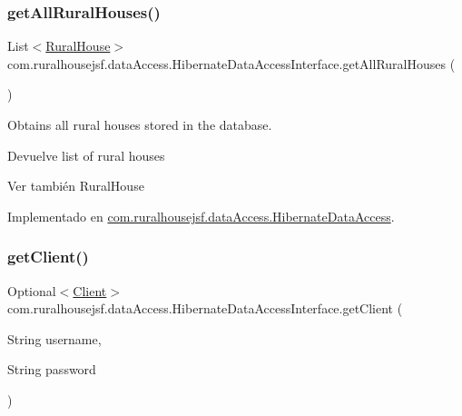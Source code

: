 \subsubsection{\texorpdfstring{getAllRuralHouses()}{getAllRuralHouses()}}
{\footnotesize\ttfamily List$<$\mbox{\hyperlink{classcom_1_1ruralhousejsf_1_1domain_1_1_rural_house}{Rural\+House}}$>$ com.\+ruralhousejsf.\+data\+Access.\+Hibernate\+Data\+Access\+Interface.\+get\+All\+Rural\+Houses (\begin{DoxyParamCaption}{ }\end{DoxyParamCaption})}



Obtains all rural houses stored in the database. 

\begin{DoxyReturn}{Devuelve}
list of rural houses
\end{DoxyReturn}
\begin{DoxySeeAlso}{Ver también}
Rural\+House 
\end{DoxySeeAlso}


Implementado en \mbox{\hyperlink{classcom_1_1ruralhousejsf_1_1data_access_1_1_hibernate_data_access_acb92be47dc680218ff3102addce8ae8f}{com.\+ruralhousejsf.\+data\+Access.\+Hibernate\+Data\+Access}}.

\mbox{\label{interfacecom_1_1ruralhousejsf_1_1data_access_1_1_hibernate_data_access_interface_abf581529aefd317dffd1d2ca0906c3ac}} 
\subsubsection{\texorpdfstring{getClient()}{getClient()}}
{\footnotesize\ttfamily Optional$<$\mbox{\hyperlink{classcom_1_1ruralhousejsf_1_1domain_1_1_client}{Client}}$>$ com.\+ruralhousejsf.\+data\+Access.\+Hibernate\+Data\+Access\+Interface.\+get\+Client (\begin{DoxyParamCaption}\item[{String}]{username,  }\item[{String}]{password }\end{DoxyParamCaption})}



